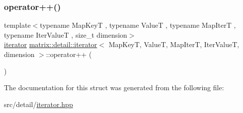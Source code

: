 \mbox{\label{structmatrix_1_1detail_1_1iterator_ad4ea8b56117367e5e8b42acb0e948b21}} 
\subsubsection{\texorpdfstring{operator++()}{operator++()}}
{\footnotesize\ttfamily template$<$typename Map\+KeyT , typename ValueT , typename Map\+IterT , typename Iter\+ValueT , size\+\_\+t dimension$>$ \\
\hyperlink{structmatrix_1_1detail_1_1iterator}{iterator} \hyperlink{structmatrix_1_1detail_1_1iterator}{matrix\+::detail\+::iterator}$<$ Map\+KeyT, ValueT, Map\+IterT, Iter\+ValueT, dimension $>$\+::operator++ (\begin{DoxyParamCaption}{ }\end{DoxyParamCaption})\hspace{0.3cm}{\ttfamily [inline]}}



The documentation for this struct was generated from the following file\+:\begin{DoxyCompactItemize}
\item 
src/detail/\hyperlink{iterator_8hpp}{iterator.\+hpp}\end{DoxyCompactItemize}
